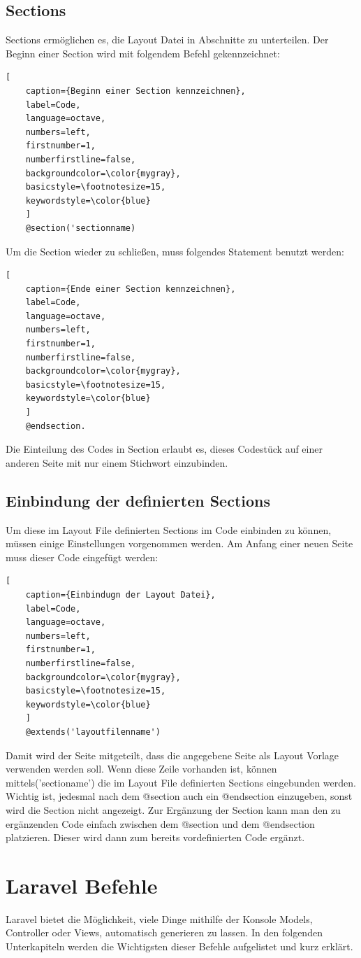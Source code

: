 \subsection{Sections}
Sections ermöglichen es, die Layout Datei in Abschnitte zu unterteilen. Der Beginn einer Section wird mit folgendem Befehl gekennzeichnet:
\begin{lstlisting}[
	caption={Beginn einer Section kennzeichnen},
	label=Code,
	language=octave,
	numbers=left,
	firstnumber=1,
	numberfirstline=false,
	backgroundcolor=\color{mygray},
	basicstyle=\footnotesize=15,
	keywordstyle=\color{blue}
	]
	@section('sectionname)
\end{lstlisting} 
Um die Section wieder zu schließen, muss folgendes Statement benutzt werden: 
\begin{lstlisting}[
	caption={Ende einer Section kennzeichnen},
	label=Code,
	language=octave,
	numbers=left,
	firstnumber=1,
	numberfirstline=false,
	backgroundcolor=\color{mygray},
	basicstyle=\footnotesize=15,
	keywordstyle=\color{blue}
	]
	@endsection.
\end{lstlisting} 
 Die Einteilung des Codes in Section erlaubt es, dieses Codestück auf einer anderen Seite mit nur einem Stichwort einzubinden. 
\subsection{Einbindung der definierten Sections}
Um diese im Layout File definierten Sections im Code einbinden zu können, müssen einige Einstellungen vorgenommen werden. Am Anfang einer neuen Seite muss dieser Code eingefügt werden:
\begin{lstlisting}[
	caption={Einbindugn der Layout Datei},
	label=Code,
	language=octave,
	numbers=left,
	firstnumber=1,
	numberfirstline=false,
	backgroundcolor=\color{mygray},
	basicstyle=\footnotesize=15,
	keywordstyle=\color{blue}
	]
	@extends('layoutfilenname')
\end{lstlisting} 


Damit wird der Seite mitgeteilt, dass die angegebene Seite als Layout Vorlage verwenden werden soll. Wenn diese Zeile vorhanden ist, können mittels\@section('sectioname') die im Layout File definierten Sections eingebunden werden. Wichtig ist,  jedesmal nach dem @section auch ein @endsection einzugeben, sonst wird die Section nicht angezeigt. Zur Ergänzung der Section kann man den zu ergänzenden Code einfach zwischen dem @section und dem @endsection platzieren. Dieser wird dann zum bereits vordefinierten Code ergänzt.
\newpage
\section{Laravel Befehle}\label{sec Laravel Befehle}
Laravel bietet die Möglichkeit, viele Dinge mithilfe der Konsole Models, Controller oder Views, automatisch generieren zu lassen. In den folgenden Unterkapiteln werden die Wichtigsten dieser Befehle aufgelistet und kurz erklärt.
